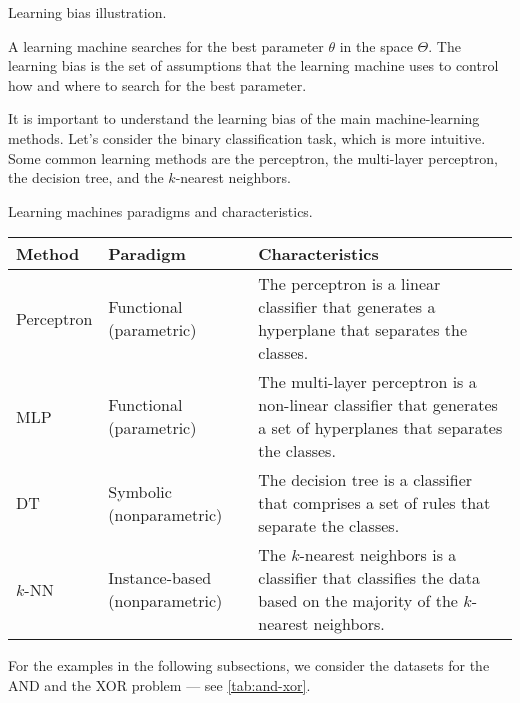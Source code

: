 \begin{figurebox}[label=fig:learning-bias]{Learning bias illustration.}
  \centering
  \tcblower
  A learning machine searches for the best parameter $\theta$ in the space $\Theta$.
  The learning bias is the set of assumptions that the learning machine uses to control
  how and where to search for the best parameter.
\end{figurebox}

It is important to understand the learning bias of the main machine-learning methods.  Let's
consider the binary classification task, which is more intuitive.  Some common learning
methods are the perceptron, the multi-layer perceptron, the decision tree, and the
$k$-nearest neighbors.

\begin{tablebox}[label=tab:paradigm]{Learning machines paradigms and characteristics.}
  \begin{tabularx}{\textwidth}{lX@{}X@{}}
    \toprule
    \textbf{Method} & \textbf{Paradigm} & \textbf{Characteristics} \\
    \midrule
    Perceptron & Functional (parametric) & The perceptron is a linear classifier that generates a hyperplane that separates the classes. \\
    MLP & Functional (parametric) & The multi-layer perceptron is a non-linear classifier that generates a set of hyperplanes that separates the classes. \\
    DT & Symbolic (nonparametric) & The decision tree is a classifier that comprises a set of rules that separate the classes. \\
    $k$-NN & Instance-based (nonparametric) & The $k$-nearest neighbors is a classifier that classifies the data based on the majority of the $k$-nearest neighbors. \\
    \bottomrule
  \end{tabularx}
\end{tablebox}

For the examples in the following subsections, we consider the datasets for the AND
and the XOR problem --- see \cref{tab:and-xor}.

